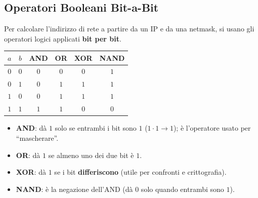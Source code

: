 \subsection{Operatori Booleani Bit-a-Bit}
Per calcolare l'indirizzo di rete a partire da un IP e da una netmask, si usano gli operatori logici applicati \textbf{bit per bit}.
\begin{center}
\begin{tabular}{cc|cccc}
\hline
$a$ & $b$ & AND & OR & XOR & NAND \\
\hline
$0$ & $0$ & $0$ & $0$ & $0$ & $1$ \\
$0$ & $1$ & $0$ & $1$ & $1$ & $1$ \\
$1$ & $0$ & $0$ & $1$ & $1$ & $1$ \\
$1$ & $1$ & $1$ & $1$ & $0$ & $0$ \\
\hline
\end{tabular}
\end{center}
\begin{itemize}
    \item \textbf{AND}: dà $1$ solo se entrambi i bit sono $1$ ($1\cdot 1 \to 1$); è l'operatore usato per ``mascherare''.
    \item \textbf{OR}: dà $1$ se almeno uno dei due bit è $1$.
    \item \textbf{XOR}: dà $1$ se i bit \textbf{differiscono} (utile per confronti e crittografia).
    \item \textbf{NAND}: è la negazione dell'AND (dà $0$ solo quando entrambi sono $1$).
\end{itemize}


